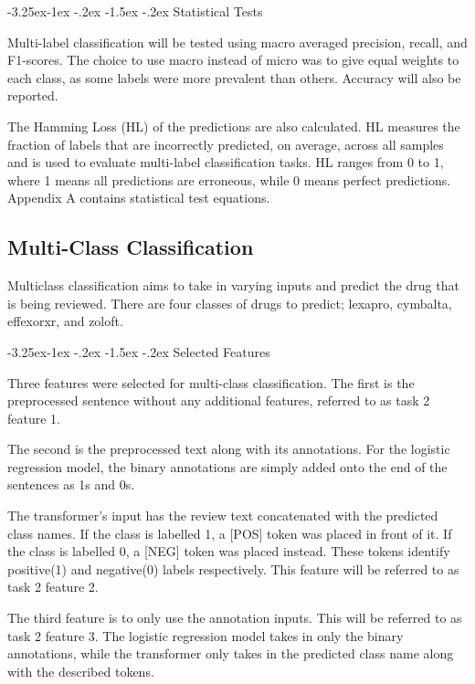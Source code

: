 \documentclass[10.7pt, onecolumn]{article}
\makeatletter
\renewcommand\subsubsection{\@startsection{subsubsection}{3}{\z@}%
	{-3.25ex\@plus -1ex \@minus -.2ex}%
    {-1.5ex \@plus -.2ex}%
    {\normalfont\itshape}}
\makeatother
\begin{document}
\subsubsection{Statistical Tests}

Multi-label classification will be tested using macro averaged precision, recall, and F1-scores. The choice to use macro instead of micro was to give equal weights to each class, as some labels were more prevalent than others. Accuracy will also be reported.

The Hamming Loss (HL) of the predictions are also calculated. HL measures the fraction of labels that are incorrectly predicted, on average, across all samples and is used to evaluate multi-label classification tasks\cite{hammingloss}. HL ranges from 0 to 1, where 1 means all predictions are erroneous, while 0 means perfect predictions. Appendix A contains statistical test equations.

\subsection{Multi-Class Classification}

Multiclass classification aims to take in varying inputs and predict the drug that is being reviewed. There are four classes of drugs to predict; lexapro, cymbalta, effexorxr, and zoloft.

\subsubsection{Selected Features}

Three features were selected for multi-class classification. The first is the preprocessed sentence without any additional features, referred to as task 2 feature 1. 

The second is the preprocessed text along with its annotations. For the logistic regression model, the binary annotations are simply added onto the end of the sentences as 1s and 0s. 

The transformer's input has the review text concatenated with the predicted class names. If the class is labelled 1, a [POS] token was placed in front of it. If the class is labelled 0, a [NEG] token was placed instead. These tokens identify positive(1) and negative(0) labels respectively. This feature will be referred to as task 2 feature 2.

The third feature is to only use the annotation inputs. This will be referred to as task 2 feature 3. The logistic regression model takes in only the binary annotations, while the transformer only takes in the predicted class name along with the described tokens.
\end{document}
